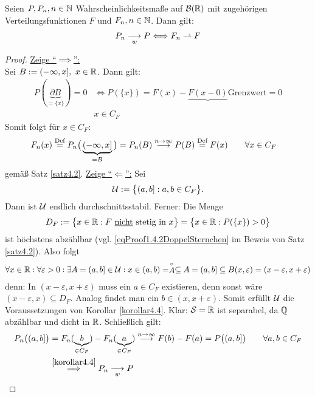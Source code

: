 \begin{korollar}\label{korollar4.5}
	Seien $P,P_n,n\in\mathbb{N}$ Wahrscheinlichkeitsmaße auf $\mathcal{B}(\mathbb{R})$ mit zugehörigen Verteilungsfunktionen $F$ und $F_n,n\in\mathbb{N}$. 
	Dann gilt:
	\begin{align*}
		P_n\underset{w}{\overset{}{\longrightarrow}}P
		\Longleftrightarrow
		F_n\rightharpoonup F
	\end{align*}
\end{korollar}

\begin{proof}
	\underline{Zeige ``$\implies$'':}\\
	Sei $B:=(-\infty,x],~x\in\mathbb{R}$. 
	Dann gilt:
	\begin{align*}
		P(\underbrace{\partial B}_{=\lbrace x\rbrace})=0
		&\Longleftrightarrow P(\lbrace x\rbrace)=F(x)-\underbrace{F(x-0)}{\text{Grenzwert}}=0\\
		& x\in C_F
	\end{align*}
	Somit folgt für $x\in C_F$:
	\begin{align*}
		F_n(x)&\stackrel{\text{Def}}{=}
		P_n\big(\underbrace{(-\infty,x]}_{=B}\big)=P_n(B)\stackrel{n\to\infty}{\longrightarrow} P(B)\stackrel{\text{Def}}{=} F(x)\qquad\forall x\in C_F
	\end{align*}
	gemäß Satz \ref{satz4.2}.\nl
	\underline{Zeige ``$\Longleftarrow$'':} Sei
	\begin{align*}
		\mathcal{U}:=\big\lbrace (a,b]:a,b\in C_F\big\rbrace.
	\end{align*}
	Dann ist $\mathcal{U}$ endlich durchschnittsstabil. Ferner: Die Menge 
	\begin{align*}
		D_F:=\big\lbrace x\in\mathbb{R}: F\text{ \underline{nicht} stetig in }x\big\rbrace
		=\big\lbrace x\in\mathbb{R}:P(\lbrace x\rbrace)>0\big\rbrace
	\end{align*}
	ist höchstens abzählbar (vgl. \eqref{eqProof1.4.2DoppelSternchen} 
	im Beweis von Satz \ref{satz4.2}). Also folgt
	\begin{align*}
		\forall x\in\mathbb{R}:\forall\varepsilon>0:\exists A=(a,b]\in\mathcal{U}:
		x\in (a,b)=\stackrel{\circ}{A}\subseteq A=(a,b]\subseteq B(x,\varepsilon)=(x-\varepsilon,x+\varepsilon)
	\end{align*}
	denn: 
	In $(x-\varepsilon,x+\varepsilon)$ muss ein $a\in C_F$ existieren, denn sonst wäre $(x-\varepsilon, x)\subseteq D_F$. 
	Analog findet man ein $b\in(x,x+\varepsilon)$. 
	Somit erfüllt $\mathcal{U}$ die Voraussetzungen von Korollar \ref{korollar4.4}. 
	Klar: $\mathcal{S}=\mathbb{R}$ ist separabel, da $\mathbb{Q}$ abzählbar und dicht in $\mathbb{R}$. 
	Schließlich gilt:
	\begin{align*}
		P_n\big((a,b]\big)&=
		F_n(\underbrace{b}_{\in C_F})-F_n(\underbrace{a}_{\in C_F})\stackrel{n\to\infty}{\longrightarrow} F(b)-F(a)
		=P\big((a,b]\big)\qquad\forall a,b\in C_F\\
		&\stackrel{\ref{korollar4.4}}{\implies}
		P_n\underset{w}{\overset{}{\longrightarrow}} P
\end{align*}
\end{proof}

